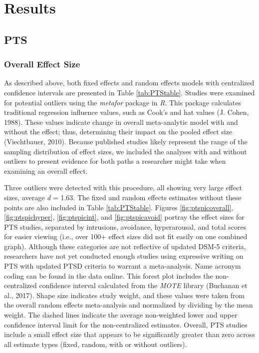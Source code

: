 \documentclass[english,man, mask]{apa6}
\theoremstyle{definition}
\theoremstyle{definition}
\theoremstyle{definition}
\theoremstyle{remark}
\begin{document}
\section{Results}\label{results}

\subsection{PTS}\label{pts}

\subsubsection{Overall Effect Size}\label{overall-effect-size}

As described above, both fixed effects and random effects models with
centralized confidence intervals are presented in Table
\ref{tab:PTStable}. Studies were examined for potential outliers using
the \emph{metafor} package in \emph{R}. This package calculates
traditional regression influence values, such as Cook's and hat values
(J. Cohen, 1988). These values indicate change in overall meta-analytic
model with and without the effect; thus, determining their impact on the
pooled effect size (Viechtbauer, 2010). Because published studies likely
represent the range of the sampling distribution of effect sizes, we
included the analyses with and without outliers to present evidence for
both paths a researcher might take when examining an overall effect.

Three outliers were detected with this procedure, all showing very large
effect sizes, average \emph{d} = 1.63. The fixed and random effects
estimates without these points are also included in Table
\ref{tab:PTStable}. Figures \ref{fig:ptspicoverall},
\ref{fig:ptspichyper}, \ref{fig:ptspicint}, and \ref{fig:ptspicavoid}
portray the effect sizes for PTS studies, separated by intrusions,
avoidance, hyperarousal, and total scores for easier viewing (i.e., over
100+ effect sizes did not fit easily on one combined graph). Although
these categories are not reflective of updated DSM-5 criteria,
researchers have not yet conducted enough studies using expressive
writing on PTS with updated PTSD criteria to warrant a meta-analysis.
Name acronym coding can be found in the data online. This forest plot
includes the non-centralized confidence interval calculated from the
\emph{MOTE} library (Buchanan et al., 2017). Shape size indicates study
weight, and these values were taken from the overall random effects
meta-analysis and normalized by dividing by the mean weight. The dashed
lines indicate the average non-weighted lower and upper confidence
interval limit for the non-centralized estimates. Overall, PTS studies
include a small effect size that appears to be significantly greater
than zero across all estimate types (fixed, random, with or without
outliers).
\end{document}
